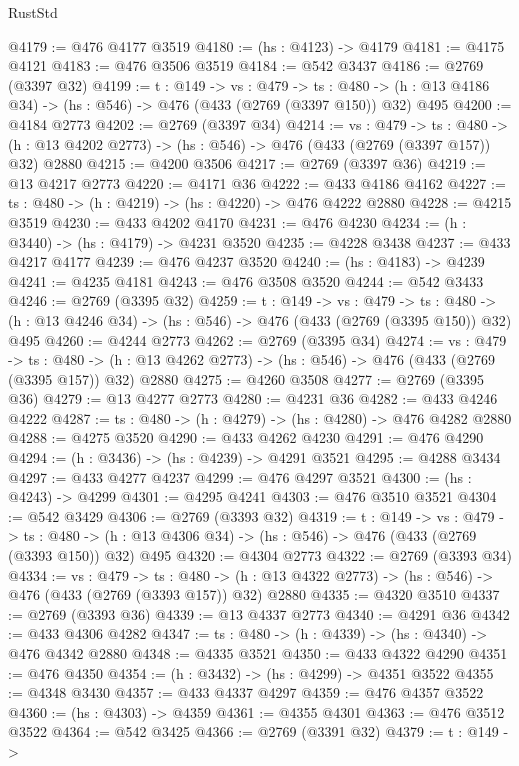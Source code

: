 \begin{lexlean}{RustStd}
\begin{coremodule}
@4179 := @476 @4177 @3519
@4180 := (hs : @4123) -> @4179
@4181 := @4175 @4121
@4183 := @476 @3506 @3519
@4184 := @542 @3437
@4186 := @2769 (@3397 @32)
@4199 := {t : @149} ->
  {vs : @479} ->
  {ts : @480} -> (h : @13 @4186 @34) -> (hs : @546) -> @476 (@433 (@2769 (@3397 @150)) @32) @495
@4200 := @4184 @2773
@4202 := @2769 (@3397 @34)
@4214 := {vs : @479} ->
  {ts : @480} -> (h : @13 @4202 @2773) -> (hs : @546) -> @476 (@433 (@2769 (@3397 @157)) @32) @2880
@4215 := @4200 @3506
@4217 := @2769 (@3397 @36)
@4219 := @13 @4217 @2773
@4220 := @4171 @36
@4222 := @433 @4186 @4162
@4227 := {ts : @480} -> (h : @4219) -> (hs : @4220) -> @476 @4222 @2880
@4228 := @4215 @3519
@4230 := @433 @4202 @4170
@4231 := @476 @4230
@4234 := (h : @3440) -> (hs : @4179) -> @4231 @3520
@4235 := @4228 @3438
@4237 := @433 @4217 @4177
@4239 := @476 @4237 @3520
@4240 := (hs : @4183) -> @4239
@4241 := @4235 @4181
@4243 := @476 @3508 @3520
@4244 := @542 @3433
@4246 := @2769 (@3395 @32)
@4259 := {t : @149} ->
  {vs : @479} ->
  {ts : @480} -> (h : @13 @4246 @34) -> (hs : @546) -> @476 (@433 (@2769 (@3395 @150)) @32) @495
@4260 := @4244 @2773
@4262 := @2769 (@3395 @34)
@4274 := {vs : @479} ->
  {ts : @480} -> (h : @13 @4262 @2773) -> (hs : @546) -> @476 (@433 (@2769 (@3395 @157)) @32) @2880
@4275 := @4260 @3508
@4277 := @2769 (@3395 @36)
@4279 := @13 @4277 @2773
@4280 := @4231 @36
@4282 := @433 @4246 @4222
@4287 := {ts : @480} -> (h : @4279) -> (hs : @4280) -> @476 @4282 @2880
@4288 := @4275 @3520
@4290 := @433 @4262 @4230
@4291 := @476 @4290
@4294 := (h : @3436) -> (hs : @4239) -> @4291 @3521
@4295 := @4288 @3434
@4297 := @433 @4277 @4237
@4299 := @476 @4297 @3521
@4300 := (hs : @4243) -> @4299
@4301 := @4295 @4241
@4303 := @476 @3510 @3521
@4304 := @542 @3429
@4306 := @2769 (@3393 @32)
@4319 := {t : @149} ->
  {vs : @479} ->
  {ts : @480} -> (h : @13 @4306 @34) -> (hs : @546) -> @476 (@433 (@2769 (@3393 @150)) @32) @495
@4320 := @4304 @2773
@4322 := @2769 (@3393 @34)
@4334 := {vs : @479} ->
  {ts : @480} -> (h : @13 @4322 @2773) -> (hs : @546) -> @476 (@433 (@2769 (@3393 @157)) @32) @2880
@4335 := @4320 @3510
@4337 := @2769 (@3393 @36)
@4339 := @13 @4337 @2773
@4340 := @4291 @36
@4342 := @433 @4306 @4282
@4347 := {ts : @480} -> (h : @4339) -> (hs : @4340) -> @476 @4342 @2880
@4348 := @4335 @3521
@4350 := @433 @4322 @4290
@4351 := @476 @4350
@4354 := (h : @3432) -> (hs : @4299) -> @4351 @3522
@4355 := @4348 @3430
@4357 := @433 @4337 @4297
@4359 := @476 @4357 @3522
@4360 := (hs : @4303) -> @4359
@4361 := @4355 @4301
@4363 := @476 @3512 @3522
@4364 := @542 @3425
@4366 := @2769 (@3391 @32)
@4379 := {t : @149} ->

\end{coremodule}
\end{lexlean}
